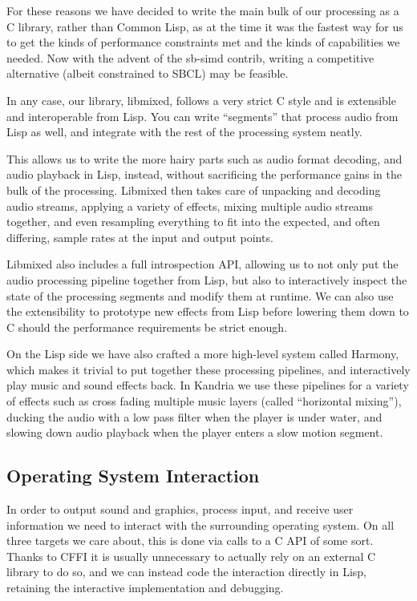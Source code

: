 \documentclass[format=sigconf]{acmart}
\begin{document}
For these reasons we have decided to write the main bulk of our processing as a C library, rather than Common Lisp, as at the time it was the fastest way for us to get the kinds of performance constraints met and the kinds of capabilities we needed. Now with the advent of the sb-simd contrib, writing a competitive alternative (albeit constrained to SBCL) may be feasible.

In any case, our library, libmixed, follows a very strict C style and is extensible and interoperable from Lisp. You can write ``segments'' that process audio from Lisp as well, and integrate with the rest of the processing system neatly.

This allows us to write the more hairy parts such as audio format decoding, and audio playback in Lisp, instead, without sacrificing the performance gains in the bulk of the processing. Libmixed then takes care of unpacking and decoding audio streams, applying a variety of effects, mixing multiple audio streams together, and even resampling everything to fit into the expected, and often differing, sample rates at the input and output points.

Libmixed also includes a full introspection API, allowing us to not only put the audio processing pipeline together from Lisp, but also to interactively inspect the state of the processing segments and modify them at runtime. We can also use the extensibility to prototype new effects from Lisp before lowering them down to C should the performance requirements be strict enough.

On the Lisp side we have also crafted a more high-level system called Harmony, which makes it trivial to put together these processing pipelines, and interactively play music and sound effects back. In Kandria we use these pipelines for a variety of effects such as cross fading multiple music layers (called ``horizontal mixing''), ducking the audio with a low pass filter when the player is under water, and slowing down audio playback when the player enters a slow motion segment.

\subsection{Operating System Interaction}\label{os}
In order to output sound and graphics, process input, and receive user information we need to interact with the surrounding operating system. On all three targets we care about, this is done via calls to a C API of some sort. Thanks to CFFI it is usually unnecessary to actually rely on an external C library to do so, and we can instead code the interaction directly in Lisp, retaining the interactive implementation and debugging.
\end{document}
